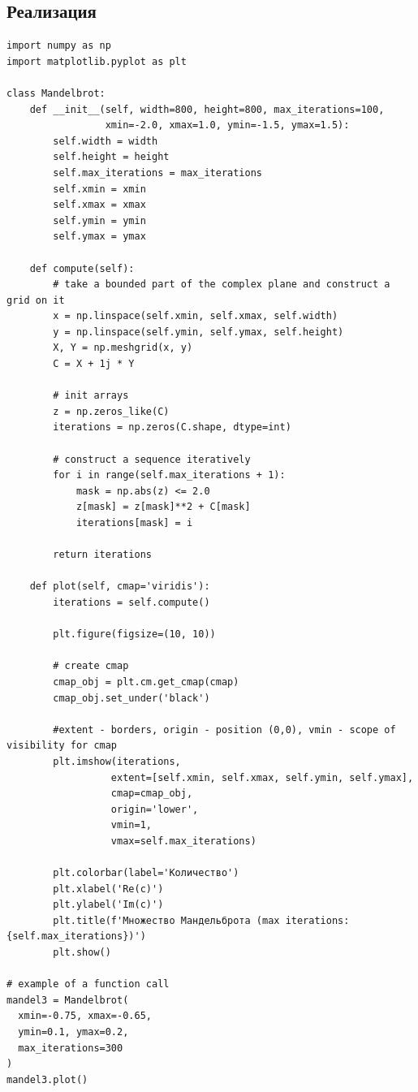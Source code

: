 \subsection{Реализация}

\begin{lstlisting}[caption=Построение множества Мандельброта]
import numpy as np
import matplotlib.pyplot as plt

class Mandelbrot:
    def __init__(self, width=800, height=800, max_iterations=100, 
                 xmin=-2.0, xmax=1.0, ymin=-1.5, ymax=1.5):
        self.width = width
        self.height = height
        self.max_iterations = max_iterations
        self.xmin = xmin
        self.xmax = xmax
        self.ymin = ymin
        self.ymax = ymax
        
    def compute(self):
        # take a bounded part of the complex plane and construct a grid on it
        x = np.linspace(self.xmin, self.xmax, self.width)
        y = np.linspace(self.ymin, self.ymax, self.height)
        X, Y = np.meshgrid(x, y)
        C = X + 1j * Y
        
        # init arrays
        z = np.zeros_like(C)
        iterations = np.zeros(C.shape, dtype=int)
        
        # construct a sequence iteratively
        for i in range(self.max_iterations + 1):
            mask = np.abs(z) <= 2.0
            z[mask] = z[mask]**2 + C[mask]
            iterations[mask] = i
        
        return iterations
    
    def plot(self, cmap='viridis'):
        iterations = self.compute()
        
        plt.figure(figsize=(10, 10))
        
        # create cmap
        cmap_obj = plt.cm.get_cmap(cmap)
        cmap_obj.set_under('black')
        
        #extent - borders, origin - position (0,0), vmin - scope of visibility for cmap
        plt.imshow(iterations, 
                  extent=[self.xmin, self.xmax, self.ymin, self.ymax],
                  cmap=cmap_obj, 
                  origin='lower',
                  vmin=1,
                  vmax=self.max_iterations)
        
        plt.colorbar(label='Количество')
        plt.xlabel('Re(c)')
        plt.ylabel('Im(c)')
        plt.title(f'Множество Мандельброта (max iterations: {self.max_iterations})')
        plt.show()

# example of a function call
mandel3 = Mandelbrot(
  xmin=-0.75, xmax=-0.65,
  ymin=0.1, ymax=0.2,
  max_iterations=300
)
mandel3.plot()
\end{lstlisting}

